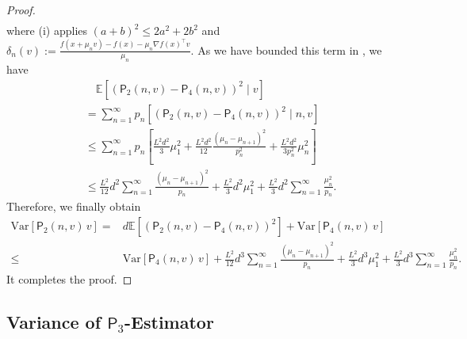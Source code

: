 \documentclass{article}
\newcommand{\Var}{\mathrm{Var}}
\newcommand{\EE}{\mathbb{E}}
\theoremstyle{definition}
\theoremstyle{plain}
\theoremstyle{remark}
\newcommand{\sfP}{\mathsf{P}}
\begin{document}
\begin{proof}
\begin{align*}
    \end{align*}
    where (i) applies $(a+b)^2 \leq 2a^2 + 2b^2$ and $\delta_n(v):= \frac{f(x+\mu_n v) - f(x) -\mu_n \nabla f(x)^\top v}{\mu_n}$. As we have bounded this term in , we have
    \begin{align*}
        &\quad \EE[ (\mathsf{P}_2(n, v) - \mathsf{P}_4(n, v))^2\mid  v] \\
        &= \sum_{n=1}^\infty p_n [ (\mathsf{P}_2(n, v) - \mathsf{P}_4(n, v))^2\mid  n, v] \\ 
        &\leq \sum_{n=1}^\infty p_n \left[ \frac{L^2 d^2}{3}\mu_1^2 + \frac{L^2 d^2}{12}\frac{(\mu_n-\mu_{n+1})^2}{p_n^2} + \frac{L^2 d^2}{3 p_n^2} \mu_{n}^2\right]  \\
        &\leq \frac{L^2}{12}  d^2\sum_{n=1}^\infty \frac{(\mu_n - \mu_{n+1})^2}{p_n} + \frac{L^2 }{3} d^2\mu_1^2 + \frac{L^2}{3} d^2 \sum_{n=1}^\infty \frac{\mu_n^2}{p_n}.
    \end{align*}
    Therefore, we finally obtain
\begin{align*}
    \Var[\sfP_2(n,v) \, v ]  = & d\EE[(\sfP_2(n,v)- \sfP_4(n,v))^2  ] + \Var[\sfP_4(n,v)\, v] \\ 
    \leq & \Var[\sfP_4(n,v)\, v] + \frac{L^2}{12}  d^3\sum_{n=1}^\infty \frac{(\mu_n - \mu_{n+1})^2}{p_n} + \frac{L^2 }{3} d^3\mu_1^2 + \frac{L^2}{3} d^3 \sum_{n=1}^\infty \frac{\mu_n^2}{p_n}.
\end{align*}
It completes the proof. 
\end{proof}

 




\subsection{Variance of $\mathsf{P}_3$-Estimator}%
 
\end{document}
